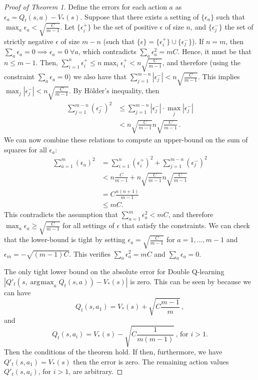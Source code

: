\documentclass[letterpaper]{article}
\DeclareMathOperator*{\argmax}{\arg\!\max}
\begin{document}
\begin{proof}[Proof of Theorem 1]
Define the errors for each action $a$ as $\epsilon_a = Q_t(s,a) - V_*(s)$. Suppose that there exists a setting of $\{ \epsilon_a \}$ such that $\max_a \epsilon_a < \sqrt{\frac{C}{m-1}}$. Let $\{ \epsilon^+_i \}$ be the set of positive $\epsilon$ of size $n$, and $\{ \epsilon^-_j \}$ the set of strictly negative $\epsilon$ of size $m-n$ (such that $\{ \epsilon\} = \{ \epsilon^+_i \} \cup \{ \epsilon^-_j \}$). If $n=m$, then $\sum_a \epsilon_a = 0 \implies \epsilon_a = 0 \;\forall a$, which contradicts $\sum_a \epsilon_a^2 = m C$. Hence, it must be that $n \leq m-1$. Then, $\sum_{i=1}^n \epsilon^+_i \le n \max_i \epsilon^+_i < n \sqrt{\frac{C}{m-1}}$, and therefore (using the constraint $\sum_a \epsilon_a = 0$) we also have that $\sum_{j=1}^{m-n} |\epsilon^-_j| < n \sqrt{\frac{C}{m-1}}$. This implies $\max_j |\epsilon^-_j| < n \sqrt{\frac{C}{m-1}}$. 
By H\"{o}lder's inequality, then
\begin{align*}
\sum_{j=1}^{m-n} (\epsilon^-_j)^2
&\leq \sum_{j=1}^{m-n} |\epsilon^-_j| \cdot \max_j |\epsilon^-_j| \\
&< n \sqrt{\frac{C}{m-1}} n \sqrt{\frac{C}{m-1}}\,.
\end{align*}
We can now combine these relations to compute an upper-bound on the sum of squares for all $\epsilon_a$:
\begin{align*}
\sum_{a=1}^m (\epsilon_a)^2 &= \sum_{i=1}^{n} (\epsilon^+_i)^2 + \sum_{j=1}^{m-n} (\epsilon^-_j)^2 \\ 
&< n \frac{C}{m-1} +  n \sqrt{\frac{C}{m-1}} n \sqrt{\frac{C}{m-1}} \\
&= C \frac{n(n+1)}{m-1}\\
&\leq m C.
\end{align*}
This contradicts the assumption that $\sum_{a=1}^m \epsilon_a^2 < m C$, and therefore $\max_a \epsilon_a \geq \sqrt{\frac{C}{m-1}}$ for all settings of $\epsilon$ that satisfy the constraints. We can check that the lower-bound is tight by setting $\epsilon_a = \sqrt{\frac{C}{m-1}}$ for $a=1,\dots,m-1$ and $\epsilon_m = - \sqrt{(m-1)C}$. This verifies $\sum_a \epsilon_a^2 = m C$ and $\sum_a \epsilon_a = 0$.

The only tight lower bound on the absolute error for Double Q-learning $|Q'_t(s,\argmax_a Q_t(s,a) ) - V_*(s)|$ is zero.
This can be seen by because we can have
\[
Q_t(s,a_1) = V_*(s) + \sqrt{C\frac{m-1}{m}}\,,
\]
and
\[
Q_t(s,a_i) = V_*(s)-\sqrt{C\frac{1}{m(m-1)}}\,\text{, for $i > 1$.}
\]
Then the conditions of the theorem hold.  If then, furthermore, we have $Q'_t(s,a_1) = V_*(s)$ then the error is zero.  The remaining action values $Q'_t(s,a_i)$, for $i>1$, are arbitrary.
\end{proof}
\end{document}
